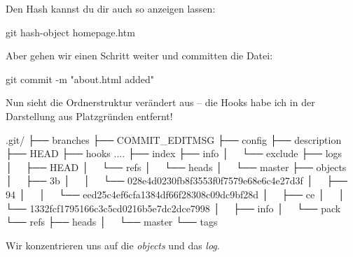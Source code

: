 \documentclass[
  letterpaper,
  DIV=11]{scrreprt}
\newenvironment{Shaded}{\begin{snugshade}}{\end{snugshade}}
\newcommand{\AttributeTok}[1]{\textcolor[rgb]{0.40,0.45,0.13}{#1}}
\newcommand{\ExtensionTok}[1]{\textcolor[rgb]{0.00,0.23,0.31}{#1}}
\newcommand{\FunctionTok}[1]{\textcolor[rgb]{0.28,0.35,0.67}{#1}}
\newcommand{\NormalTok}[1]{\textcolor[rgb]{0.00,0.23,0.31}{#1}}
\newcommand{\StringTok}[1]{\textcolor[rgb]{0.13,0.47,0.30}{#1}}
\begin{document}
Den Hash kannst du dir auch so anzeigen lassen:

\begin{Shaded}
\begin{Highlighting}[]
\FunctionTok{git}\NormalTok{ hash{-}object homepage.htm }
\end{Highlighting}
\end{Shaded}

Aber gehen wir einen Schritt weiter und committen die Datei:

\begin{Shaded}
\begin{Highlighting}[]
\FunctionTok{git}\NormalTok{ commit }\AttributeTok{{-}m} \StringTok{"about.html added"}
\end{Highlighting}
\end{Shaded}

Nun sieht die Ordnerstruktur verändert aus -- die Hooks habe ich in der
Darstellung aus Platzgründen entfernt!

\begin{Shaded}
\begin{Highlighting}[]
\ExtensionTok{.git/}
\ExtensionTok{├──}\NormalTok{ branches}
\ExtensionTok{├──}\NormalTok{ COMMIT\_EDITMSG}
\ExtensionTok{├──}\NormalTok{ config}
\ExtensionTok{├──}\NormalTok{ description}
\ExtensionTok{├──}\NormalTok{ HEAD}
\ExtensionTok{├──}\NormalTok{ hooks}
    \ExtensionTok{....}
\ExtensionTok{├──}\NormalTok{ index}
\ExtensionTok{├──}\NormalTok{ info}
\ExtensionTok{│  }\NormalTok{ └── exclude}
\ExtensionTok{├──}\NormalTok{ logs}
\ExtensionTok{│  }\NormalTok{ ├── HEAD}
\ExtensionTok{│  }\NormalTok{ └── refs}
\ExtensionTok{│  }\NormalTok{     └── heads}
\ExtensionTok{│  }\NormalTok{         └── master}
\ExtensionTok{├──}\NormalTok{ objects}
\ExtensionTok{│  }\NormalTok{ ├── 3b  }
\ExtensionTok{│  }\NormalTok{ │   └── 028e4d0230fb8f3553f0f7579e68e6c4e27d3f}
\ExtensionTok{│  }\NormalTok{ ├── 94}
\ExtensionTok{│  }\NormalTok{ │   └── eed25c4ef6cfa1384df66f28308c09dc9bf28d}
\ExtensionTok{│  }\NormalTok{ ├── ce}
\ExtensionTok{│  }\NormalTok{ │   └── 1332fcf1795166c3c5cd0216b5e7dc2dce7998}
\ExtensionTok{│  }\NormalTok{ ├── info}
\ExtensionTok{│  }\NormalTok{ └── pack}
\ExtensionTok{└──}\NormalTok{ refs}
    \ExtensionTok{├──}\NormalTok{ heads}
    \ExtensionTok{│  }\NormalTok{ └── master}
    \ExtensionTok{└──}\NormalTok{ tags}
\end{Highlighting}
\end{Shaded}

Wir konzentrieren uns auf die \emph{objects} und das \emph{log}.
\end{document}
